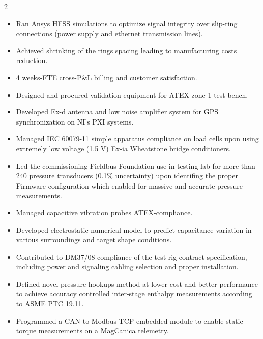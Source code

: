 \documentclass[9pt,a4paper,ragged2e,withhyper]{altacv} %
\begin{document}
\begin{paracol}{2}
\begin{itemize}
\item Ran Ansys HFSS simulations to optimize signal integrity over slip-ring connections (power supply and ethernet transmission lines).
\item Achieved shrinking of the rings spacing leading to manufacturing costs reduction.
\item 4 weeks-FTE cross-P\&L billing and customer satisfaction.
\end{itemize}
\divider

\begin{itemize}
\item Designed and procured validation equipment for ATEX zone 1 test bench.
\item Developed Ex-d antenna and low noise amplifier system for GPS synchronization on NI's PXI systems.
\item Managed IEC 60079-11 simple apparatus compliance on load cells upon using extremely low voltage (1.5 V) Ex-ia Wheatstone bridge conditioners.
\end{itemize}
\divider

\begin{itemize}
\item Led the commissioning Fieldbus Foundation use in testing lab for more than 240 pressure transducers (0.1\% uncertainty) upon identifing the proper Firmware configuration which enabled for massive and accurate pressure measurements.
\item Managed capacitive vibration probes ATEX-compliance.
\item Developed electrostatic numerical model to predict capacitance variation in various surroundings and target shape conditions.
\item Contributed to DM37/08 compliance of the test rig contract specification, including power and signaling cabling selection and proper installation.
\end{itemize}
\divider

\begin{itemize}
\item Defined novel pressure hookups method at lower cost and better performance to achieve accuracy controlled inter-stage enthalpy measurements according to ASME PTC 19.11.
\item Programmed a CAN to Modbus TCP embedded module to enable static torque measurements on a MagCanica telemetry.
\end{itemize}
\divider


\end{paracol}
\end{document}
